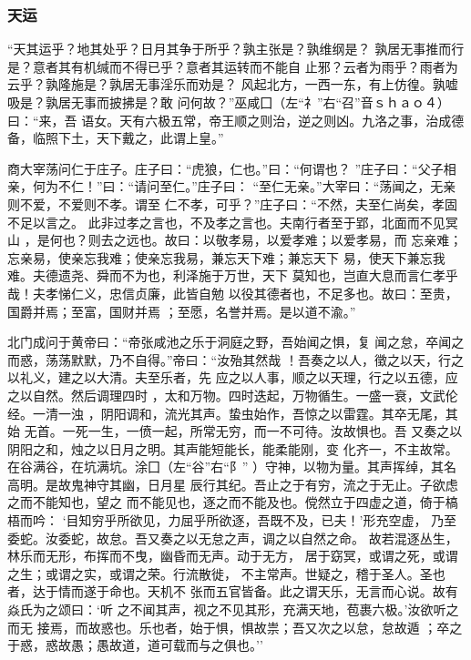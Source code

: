 \documentclass[]{article}
\begin{document}
\hypertarget{header-n2170}{%
\subsubsection{天运}\label{header-n2170}}

``天其运乎？地其处乎？日月其争于所乎？孰主张是？孰维纲是？
孰居无事推而行是？意者其有机缄而不得已乎？意者其运转而不能自
止邪？云者为雨乎？雨者为云乎？孰隆施是？孰居无事淫乐而劝是？
风起北方，一西一东，有上仿徨。孰嘘吸是？孰居无事而披拂是？敢
问何故？''巫咸囗（左``礻''右``召''音ｓｈａｏ４）曰：``来，吾
语女。天有六极五常，帝王顺之则治，逆之则凶。九洛之事，治成德
备，临照下土，天下戴之，此谓上皇。''

商大宰荡问仁于庄子。庄子曰：``虎狼，仁也。''曰：``何谓也？
''庄子曰：``父子相亲，何为不仁！''曰：``请问至仁。''庄子曰：
``至仁无亲。''大宰曰：``荡闻之，无亲则不爱，不爱则不孝。谓至
仁不孝，可乎？''庄子曰：``不然，夫至仁尚矣，孝固不足以言之。
此非过孝之言也，不及孝之言也。夫南行者至于郢，北面而不见冥山
，是何也？则去之远也。故曰：以敬孝易，以爱孝难；以爱孝易，而
忘亲难；忘亲易，使亲忘我难；使亲忘我易，兼忘天下难；兼忘天下
易，使天下兼忘我难。夫德遗尧、舜而不为也，利泽施于万世，天下
莫知也，岂直大息而言仁孝乎哉！夫孝悌仁义，忠信贞廉，此皆自勉
以役其德者也，不足多也。故曰：至贵，国爵并焉；至富，国财并焉
；至愿，名誉并焉。是以道不渝。''

北门成问于黄帝曰：``帝张咸池之乐于洞庭之野，吾始闻之惧，复
闻之怠，卒闻之而惑，荡荡默默，乃不自得。''帝曰：``汝殆其然哉
！吾奏之以人，徵之以天，行之以礼义，建之以大清。夫至乐者，先
应之以人事，顺之以天理，行之以五德，应之以自然。然后调理四时
，太和万物。四时迭起，万物循生。一盛一衰，文武伦经。一清一浊
，阴阳调和，流光其声。蛰虫始作，吾惊之以雷霆。其卒无尾，其始
无首。一死一生，一偾一起，所常无穷，而一不可待。汝故惧也。吾
又奏之以阴阳之和，烛之以日月之明。其声能短能长，能柔能刚，变
化齐一，不主故常。在谷满谷，在坑满坑。涂囗（左``谷''右``阝''
）守神，以物为量。其声挥绰，其名高明。是故鬼神守其幽，日月星
辰行其纪。吾止之于有穷，流之于无止。子欲虑之而不能知也，望之
而不能见也，逐之而不能及也。傥然立于四虚之道，倚于槁梧而吟：
`目知穷乎所欲见，力屈乎所欲逐，吾既不及，已夫！'形充空虚，
乃至委蛇。汝委蛇，故怠。吾又奏之以无怠之声，调之以自然之命。
故若混逐丛生，林乐而无形，布挥而不曳，幽昏而无声。动于无方，
居于窈冥，或谓之死，或谓之生；或谓之实，或谓之荣。行流散徙，
不主常声。世疑之，稽于圣人。圣也者，达于情而遂于命也。天机不
张而五官皆备。此之谓天乐，无言而心说。故有焱氏为之颂曰：`听
之不闻其声，视之不见其形，充满天地，苞裹六极。'汝欲听之而无
接焉，而故惑也。乐也者，始于惧，惧故祟；吾又次之以怠，怠故遁
；卒之于惑，惑故愚；愚故道，道可载而与之俱也。''
\end{document}
